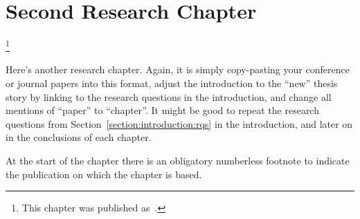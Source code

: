 
\chapter{Second Research Chapter}
\label{chapter:research-02}

\footnote[]{This chapter was published as~.}
\acresetall


Here's another research chapter. Again, it is simply copy-pasting your conference or journal papers into this format, adjust the introduction to the ``new'' thesis story by linking to the research questions in the introduction, and change all mentions of ``paper'' to ``chapter''. It might be good to repeat the research questions from Section~\ref{section:introduction:rqs} in the introduction, and later on in the conclusions of each chapter.

At the start of the chapter there is an obligatory numberless footnote to indicate the publication on which the chapter is based.